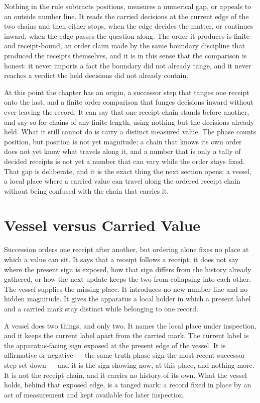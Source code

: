 Nothing in the rule subtracts positions, measures a numerical gap, or appeals to an outside number line. It reads the carried decisions at the current edge of the two chains and then either stops, when the edge decides the matter, or continues inward, when the edge passes the question along. The order it produces is finite and receipt-bound, an order claim made by the same boundary discipline that produced the receipts themselves, and it is in this sense that the comparison is honest: it never imports a fact the boundary did not already tange, and it never reaches a verdict the held decisions did not already contain.

At this point the chapter has an origin, a successor step that tanges one receipt onto the last, and a finite order comparison that funges decisions inward without ever leaving the record. It can say that one receipt chain stands before another, and say so for chains of any finite length, using nothing but the decisions already held. What it still cannot do is carry a distinct measured value. The phase counts position, but position is not yet magnitude; a chain that knows its own order does not yet know what travels along it, and a number that is only a tally of decided receipts is not yet a number that can vary while the order stays fixed. That gap is deliberate, and it is the exact thing the next section opens: a vessel, a local place where a carried value can travel along the ordered receipt chain without being confused with the chain that carries it.


\section{Vessel versus Carried Value}

Succession orders one receipt after another, but ordering alone fixes no place at which a value can sit. It says that a receipt follows a receipt; it does not say where the present sign is exposed, how that sign differs from the history already gathered, or how the next update keeps the two from collapsing into each other. The vessel supplies the missing place. It introduces no new number line and no hidden magnitude. It gives the apparatus a local holder in which a present label and a carried mark stay distinct while belonging to one record.

A vessel does two things, and only two. It names the local place under inspection, and it keeps the current label apart from the carried mark. The current label is the apparatus-facing sign exposed at the present edge of the vessel. It is affirmative or negative --- the same truth-phase sign the most recent successor step set down --- and it is the sign showing now, at this place, and nothing more. It is not the receipt chain, and it carries no history of its own. What the vessel holds, behind that exposed edge, is a tanged mark: a record fixed in place by an act of measurement and kept available for later inspection.

